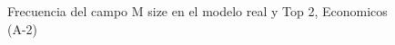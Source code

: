 \begin{figure}[H]
    \centering
    
    \caption{Frecuencia del campo M size en el modelo real y Top 2, Economicos (A-2)}
    \label{frecuency-M Size-top2}
\end{figure}
